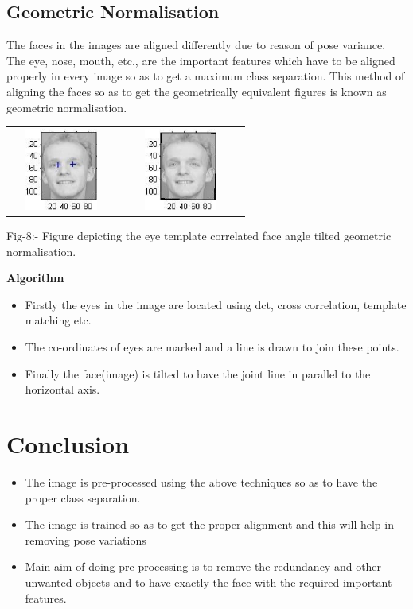 \documentclass[final,3p,times,twocolumn,sort&compress]{elsarticle}
\begin{document}
 \subsection{Geometric Normalisation}
 \hspace{1cm} The faces in the images are aligned differently due to reason of pose variance. The eye, nose, mouth, etc., are the important features which have to be aligned properly in every image so as to get a maximum class separation. This method of aligning the faces so as to get the geometrically equivalent figures is known as geometric normalisation\cite{five}.

\begin{table}[htbp]
  \begin{center}
  \begin{tabular}{cc}
    \includegraphics[width=3.3cm,height=2.7cm]{geo1} &  \includegraphics[width=3.9cm,height=2.7cm]{geo2} \\
     \end{tabular}
Fig-8:- Figure depicting the eye template correlated face angle tilted geometric normalisation.
 \end{center}
 \end{table}

 \textbf{Algorithm}
\begin{itemize}
  \item Firstly the eyes in the image are located using dct, cross correlation, template matching etc.
  \item The co-ordinates of eyes are marked and a line is drawn to join these points.
  \item Finally the face(image) is tilted to have the joint line in parallel to the horizontal axis.
\end{itemize}

\section{Conclusion}
\begin{itemize}
  \item The image is pre-processed using the above techniques so as to have the proper class separation.
  \item The image is trained so as to get the proper alignment and this will help in removing pose variations
  \item Main aim of doing pre-processing is to remove the redundancy and other unwanted objects and to have exactly the face with the required important features.
\end{itemize}
\end{document}
